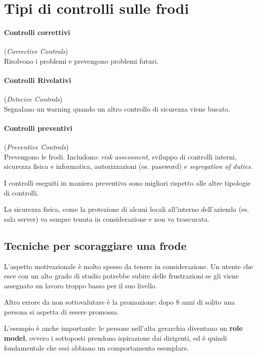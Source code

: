 \section{Tipi di controlli sulle frodi}


\paragraph*{Controlli correttivi} (\textit{Corrective Controls})\\
Risolvono i problemi e prevengono problemi futuri.

\paragraph*{Controlli Rivelativi} (\textit{Detecive Controls})\\
Segnalano un warning quando un altro controllo di sicurezza viene bucato.

\paragraph*{Controlli preventivi} (\textit{Preventive Controls})\\
Prevengono le frodi. Includono: \textit{risk assessment}, sviluppo di controlli interni, 
sicurezza fisica e informatica, autorizzazioni (es. password) e \textit{segregation of 
duties}.

I controlli eseguiti in maniera preventiva sono migliori rispetto alle
altre tipologie di controlli.

La sicurezza fisica, come la protezione di alcuni locali all'interno
dell'azienda (es. sala server) va sempre tenuta in
considerazione e non va trascurata.

\subsection{Tecniche per scoraggiare una frode}

L'aspetto motivazionale è molto spesso da tenere in considerazione.
Un utente che esce con un alto grado di studio potrebbe subire delle
frustrazioni se gli viene assegnato un lavoro troppo basso per il suo livello.

Altro errore da non sottovalutare è la promozione: dopo 8 anni di solito una
persona si aspetta di essere promossa.

L'esempio è anche importante: le persone nell'alta gerarchia diventano un
\textbf{role model}, ovvero i sottoposti prendono ispirazione dai dirigenti, ed è
quindi fondamentale che essi abbiano un comportamento esemplare.


